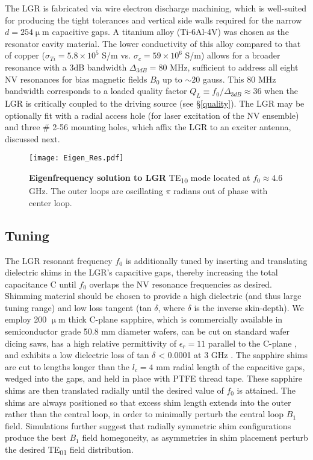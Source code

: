The LGR is fabricated via wire electron discharge machining, which is well-suited for producing the tight tolerances and vertical side walls required for the narrow $d = 254 \upmu$m capacitive gaps. A titanium alloy (Ti-6Al-4V) was chosen as the resonator cavity material. The lower conductivity of this alloy compared to that of copper ($\sigma_{Ti} = 5.8 \times 10^{5}$ S/m vs. $\sigma_c = 59 \times 10^6$ S/m) allows for a broader resonance with a 3dB bandwidth $\Delta_{3dB} = 80$ MHz, sufficient to address all eight NV resonances for bias magnetic fields $B_0$ up to $\sim 20$ gauss. This 80 MHz bandwidth corresponds to a loaded quality factor $Q_L \equiv f_0/\Delta_{3dB} \approx 36$ when the LGR
is critically coupled to the driving source (see \S \ref{quality}). The LGR may be optionally fit with a radial access hole (for laser excitation of the NV ensemble) and three \# 2-56 mounting holes, which affix the LGR to an exciter antenna, discussed next.

\begin{figure}[h!]
\centering
\texttt{[image: Eigen\_Res.pdf]}  
\caption{\textbf{Eigenfrequency solution to LGR} TE\textsubscript{10} mode located at $f_0 \approx 4.6$ GHz. The outer loops are oscillating $\pi$ radians out of phase with center loop.}
\label{LGR_Eigen}
\end{figure}


\subsection{Tuning} \label{tuning}

The LGR resonant frequency $f_0$ is additionally tuned by inserting
and translating dielectric shims in the LGR's capacitive
gaps, thereby increasing the total capacitance C until $f_0$ overlaps the NV resonance frequencies as desired. Shimming material should be chosen to provide a high dielectric (and thus large tuning range) and low loss tangent (tan $\delta$, where $\delta$ is the inverse skin-depth). We employ 200 $\upmu$m thick C-plane sapphire, which is commercially
available in semiconductor grade 50.8 mm diameter wafers, can be cut on standard wafer dicing saws, has a high relative permittivity of $\epsilon_r = 11$ parallel to the C-plane \cite{westphal1972dielectric}, and exhibits a low dielectric loss of tan $\delta$ < 0.0001 at 3 GHz \cite{westphal1972dielectric, hartnett2006sapphireshim}. The sapphire shims are cut to lengths longer than the $l_c = 4$ mm radial length of the capacitive gaps, wedged into the gaps, and held in place with PTFE thread tape. These sapphire shims are then translated radially until the desired value of $f_0$ is attained. The shims are always positioned so that excess shim length extends into the outer rather than the central loop, in order to minimally perturb the central loop $B_1$ field. Simulations further suggest that radially symmetric shim configurations produce the best $B_1$ field homegoneity, as asymmetries in shim placement perturb the desired TE\textsubscript{01} field distribution. 




